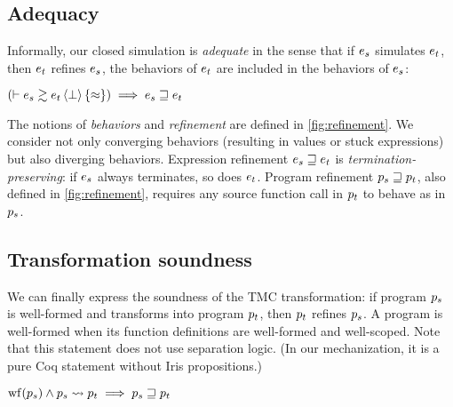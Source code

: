 \subsection{Adequacy}

Informally, our closed simulation is \emph{adequate} in the sense that if $\datalangExpr_s$ simulates $\datalangExpr_t$, then $\datalangExpr_t$ refines $\datalangExpr_s$, \ie the behaviors of $\datalangExpr_t$ are included in the behaviors of $\datalangExpr_s$:

\begin{theorem} \label{thm:adequacy}
    $
        \left( \vdash \iSimv[\bot]{\iSimilar}{\datalangExpr_s}{\datalangExpr_t} \right) \implies
        \datalangExpr_s \refined \datalangExpr_t
    $
\end{theorem}

The notions of \emph{behaviors} and \emph{refinement} are defined in \cref{fig:refinement}.
We consider not only converging behaviors (resulting in values or stuck expressions) but also diverging behaviors.
Expression refinement $\datalangExpr_s \refined \datalangExpr_t$ is \emph{termination-preserving}: if $\datalangExpr_s$ always terminates, so does $\datalangExpr_t$.
Program refinement $\datalangProg_s \refined \datalangProg_t$, also defined in \cref{fig:refinement}, requires any source function call in $\datalangProg_t$ to behave as in $\datalangProg_s$.

\subsection{Transformation soundness}

We can finally express the soundness of the TMC transformation: if program $\datalangProg_s$ is well-formed and transforms into program $\datalangProg_t$, then $\datalangProg_t$ refines $\datalangProg_s$.
A program is well-formed when its function definitions are well-formed and well-scoped.
%
Note that this statement does not use separation logic. (In our mechanization, it is a pure Coq statement without Iris propositions.)

\begin{theorem} \label{thm:soundness}
    $
        \wf{\datalangProg_s} \wedge \datalangProg_s \tmc \datalangProg_t \implies
        \datalangProg_s \refined \datalangProg_t
    $
\end{theorem}


